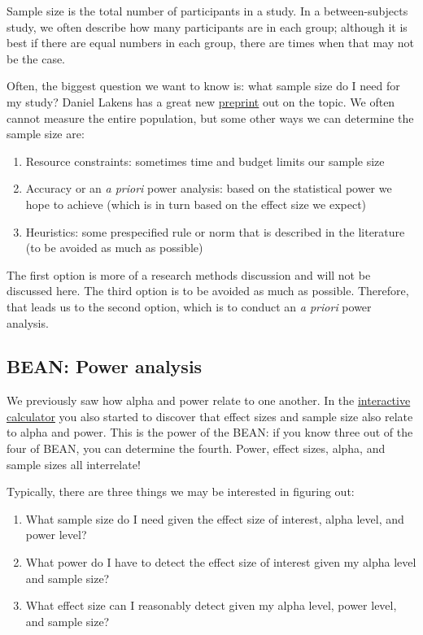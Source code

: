 \documentclass[
]{book}
\providecommand{\tightlist}{%
  \setlength{\itemsep}{0pt}\setlength{\parskip}{0pt}}
\begin{document}
Sample size is the total number of participants in a study. In a between-subjects study, we often describe how many participants are in each group; although it is best if there are equal numbers in each group, there are times when that may not be the case.

Often, the biggest question we want to know is: what sample size do I need for my study? Daniel Lakens has a great new \href{https://psyarxiv.com/9d3yf/}{preprint} out on the topic. We often cannot measure the entire population, but some other ways we can determine the sample size are:

\begin{enumerate}
\def\labelenumi{\arabic{enumi}.}
\tightlist
\item
  Resource constraints: sometimes time and budget limits our sample size
\item
  Accuracy or an \emph{a priori} power analysis: based on the statistical power we hope to achieve (which is in turn based on the effect size we expect)
\item
  Heuristics: some prespecified rule or norm that is described in the literature (to be avoided as much as possible)
\end{enumerate}

The first option is more of a research methods discussion and will not be discussed here. The third option is to be avoided as much as possible. Therefore, that leads us to the second option, which is to conduct an \emph{a priori} power analysis.

\hypertarget{bean-power-analysis}{%
\subsection{BEAN: Power analysis}\label{bean-power-analysis}}

We previously saw how alpha and power relate to one another. In the \href{https://rpsychologist.com/d3/pdist/}{interactive calculator} you also started to discover that effect sizes and sample size also relate to alpha and power. This is the power of the BEAN: if you know three out of the four of BEAN, you can determine the fourth. Power, effect sizes, alpha, and sample sizes all interrelate!

Typically, there are three things we may be interested in figuring out:

\begin{enumerate}
\def\labelenumi{\arabic{enumi}.}
\tightlist
\item
  What sample size do I need given the effect size of interest, alpha level, and power level?
\item
  What power do I have to detect the effect size of interest given my alpha level and sample size?
\item
  What effect size can I reasonably detect given my alpha level, power level, and sample size?
\end{enumerate}
\end{document}
